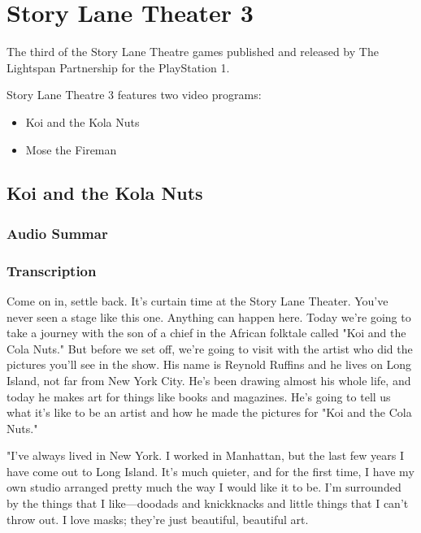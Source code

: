 \chapter{Story Lane Theater 3}


The third of the Story Lane Theatre games published and released by The Lightspan Partnership for the PlayStation 1.

Story Lane Theatre 3 features two video programs:

\begin{itemize}
    \item Koi and the Kola Nuts
    \item Mose the Fireman
\end{itemize}

\clearpage
\newpage

\section{Koi and the Kola Nuts}

\subsection{Audio Summar}

\subsection{Transcription}

Come on in, settle back. It's curtain time at the Story Lane Theater. You've never seen a stage like this one. Anything can happen here. Today we're going to take a journey with the son of a chief in the African folktale called "Koi and the Cola Nuts." But before we set off, we're going to visit with the artist who did the pictures you'll see in the show. His name is Reynold Ruffins and he lives on Long Island, not far from New York City. He's been drawing almost his whole life, and today he makes art for things like books and magazines. He's going to tell us what it's like to be an artist and how he made the pictures for "Koi and the Cola Nuts."

"I've always lived in New York. I worked in Manhattan, but the last few years I have come out to Long Island. It's much quieter, and for the first time, I have my own studio arranged pretty much the way I would like it to be. I'm surrounded by the things that I like—doodads and knickknacks and little things that I can't throw out. I love masks; they're just beautiful, beautiful art.

